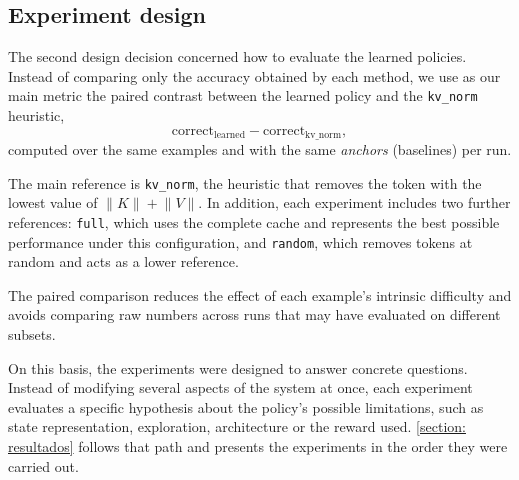\subsection{Experiment design}


The second design decision concerned how to evaluate the learned policies. Instead of comparing only the accuracy obtained by each method, we use as our main metric the paired contrast between the learned policy and the \texttt{kv\_norm} heuristic,
\[
\mathrm{correct_{learned}} - \mathrm{correct_{kv\_norm}},
\]
computed over the same examples and with the same \textit{anchors} (baselines) per run.


The main reference is \texttt{kv\_norm}, the heuristic that removes the token with the lowest value of $\lVert K\rVert + \lVert V\rVert$. In addition, each experiment includes two further references: \texttt{full}, which uses the complete cache and represents the best possible performance under this configuration, and \texttt{random}, which removes tokens at random and acts as a lower reference.

The paired comparison reduces the effect of each example's intrinsic difficulty and avoids comparing raw numbers across runs that may have evaluated on different subsets.


On this basis, the experiments were designed to answer concrete questions. Instead of modifying several aspects of the system at once, each experiment evaluates a specific hypothesis about the policy's possible limitations, such as state representation, exploration, architecture or the reward used. \cref{section: resultados} follows that path and presents the experiments in the order they were carried out.
